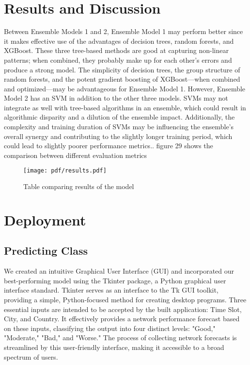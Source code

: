 \section{Results and Discussion}
Between Ensemble Models 1 and 2, Ensemble Model 1 may perform better since it makes effective use of the advantages of decision trees, random forests, and XGBoost. These three tree-based methods are good at capturing non-linear patterns; when combined, they probably make up for each other's errors and produce a strong model. The simplicity of decision trees, the group structure of random forests, and the potent gradient boosting of XGBoost—when combined and optimized—may be advantageous for Ensemble Model 1. However, Ensemble Model 2 has an SVM in addition to the other three models. SVMs may not integrate as well with tree-based algorithms in an ensemble, which could result in algorithmic disparity and a dilution of the ensemble impact.  Additionally, the complexity and training duration of SVMs may be influencing the ensemble's overall synergy and contributing to the slightly longer training period, which could lead to slightly poorer performance metrics.\cite{powers2020evaluation}. figure 29 shows the comparison between different evaluation metrics
\begin{figure}[ht!]
  \raggedright
  \texttt{[image: pdf/results.pdf]}
  \vspace{0pt}
  \caption{\textbf{ }Table comparing results of the model}
\end{figure}

\section{Deployment}
\subsection {Predicting Class}
We created an intuitive Graphical User Interface (GUI) and incorporated our best-performing model using the Tkinter package, a Python graphical user interface standard. Tkinter serves as an interface to the Tk GUI toolkit, providing a simple, Python-focused method for creating desktop programs. Three essential inputs are intended to be accepted by the built application: Time Slot, City, and Country. It effectively provides a network performance forecast based on these inputs, classifying the output into four distinct levels: "Good," "Moderate," "Bad," and "Worse." The process of collecting network forecasts is streamlined by this user-friendly interface, making it accessible to a broad spectrum of users.

